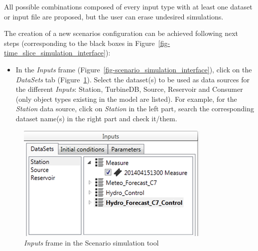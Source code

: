 \documentclass[
  letterpaper,
  DIV=11,
  numbers=noendperiod]{scrreprt}
\providecommand{\tightlist}{%
  \setlength{\itemsep}{0pt}\setlength{\parskip}{0pt}}\usepackage{longtable,booktabs,array}
\begin{document}
All possible combinations composed of every input type with at least one
dataset or input file are proposed, but the user can erase undesired
simulations.

The creation of a new scenarios configuration can be achieved following
next steps (corresponding to the black boxes in
Figure~\ref{fig-time_slice_simulation_interface}):

\begin{itemize}
\tightlist
\item
  {In the \emph{Inputs} frame
  (Figure~\ref{fig-scenario_simulation_interface}), click on the
  \emph{DataSets} tab (Figure~\ref{fig-scenario_simulation_inputs}).
  Select the dataset(s) to be used as data sources for the different
  \emph{Inputs}: Station, TurbineDB, Source, Reservoir and Consumer
  (only object types existing in the model are listed). For example, for
  the \emph{Station} data source, click on \emph{Station} in the left
  part\emph{,} search the corresponding dataset name(s) in the right
  part and check it/them.}
\end{itemize}

\begin{figure}

{\centering \includegraphics{./figures/fig-scenario_simulation_inputs.png}

}

\caption{\label{fig-scenario_simulation_inputs}\emph{Inputs} frame in
the Scenario simulation tool}

\end{figure}
\end{document}
